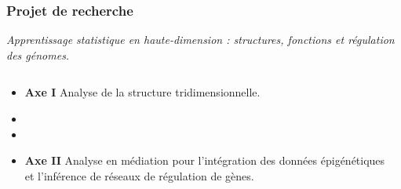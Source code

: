 \documentclass[11pt,xcolor=dvipsnames]{beamer}
\begin{document}
\begin{frame}
\frametitle{Projet de recherche}
\vspace{-2em}
\begin{center}
\em
\color{red}
Apprentissage statistique en haute-dimension : structures, fonctions et
régulation des génomes.
\end{center}

\begin{overlayarea}{12cm}{5cm}
\small
{}

\begin{columns}
\begin{column}{0.7\linewidth}
\begin{itemize}[leftmargin=*]
\footnotesize
\item<3-> {\bf Axe I} \quad Analyse de la structure tridimensionnelle.
\item<3->
\item<3->
\item<4-> {\bf Axe II} \quad Analyse en médiation pour l'intégration des
données épigénétiques et
l'inférence de réseaux de régulation de gènes.
\end{itemize}
\end{column}
\begin{column}{0.3\linewidth}
\begin{overlayarea}{0.9\linewidth}{2cm}
\end{overlayarea}
\end{column}
\end{columns}
\end{overlayarea}
\end{frame}
\end{document}
